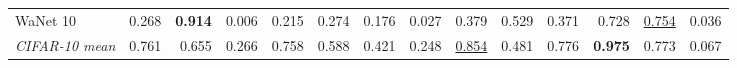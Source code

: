 \begin{table}[htbp]
\begin{adjustbox}{max width=\linewidth}
\begin{tabular}{lrrrrrrrrrrrrr}
WaNet 10 & \textcolor{black!45}{0.268} & \textbf{0.914} & \textcolor{black!45}{0.006} & \textcolor{black!45}{0.215} & \textcolor{black!45}{0.274} & \textcolor{black!45}{0.176} & \textcolor{black!45}{0.027} & \textcolor{black!45}{0.379} & 0.529 & \textcolor{black!45}{0.371} & 0.728 & \underline{0.754} & \textcolor{black!45}{0.036} \\
\rowcolor{black!8}\emph{CIFAR-10 mean} & 0.761 & 0.655 & \textcolor{black!45}{0.266} & 0.758 & 0.588 & \textcolor{black!45}{0.421} & \textcolor{black!45}{0.248} & \underline{0.854} & \textcolor{black!45}{0.481} & 0.776 & \textbf{0.975} & 0.773 & \textcolor{black!45}{0.067} \\
\bottomrule
\end{tabular}
\end{adjustbox}
\end{table}

